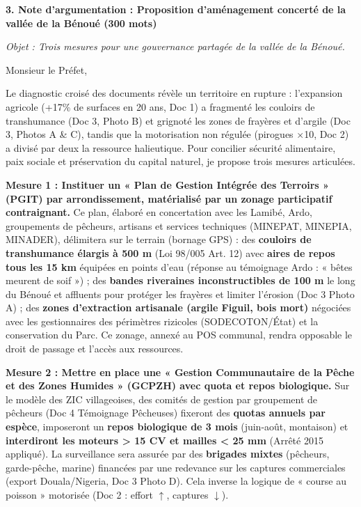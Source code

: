 \documentclass[11pt]{article}
\begin{document}
\begin{exoresolu}
\textbf{3. Note d'argumentation : Proposition d'aménagement concerté de la vallée de la Bénoué (300 mots)}

\textit{Objet : Trois mesures pour une gouvernance partagée de la vallée de la Bénoué.}

Monsieur le Préfet,

Le diagnostic croisé des documents révèle un territoire en rupture : l'expansion agricole (+17\% de surfaces en 20 ans, Doc 1) a fragmenté les couloirs de transhumance (Doc 3, Photo B) et grignoté les zones de frayères et d'argile (Doc 3, Photos A \& C), tandis que la motorisation non régulée (pirogues $\times$10, Doc 2) a divisé par deux la ressource halieutique. Pour concilier sécurité alimentaire, paix sociale et préservation du capital naturel, je propose trois mesures articulées.

\textbf{Mesure 1 : Instituer un « Plan de Gestion Intégrée des Terroirs » (PGIT) par arrondissement, matérialisé par un zonage participatif contraignant.} Ce plan, élaboré en concertation avec les Lamibé, Ardo, groupements de pêcheurs, artisans et services techniques (MINEPAT, MINEPIA, MINADER), délimitera sur le terrain (bornage GPS) : des \textbf{couloirs de transhumance élargis à 500 m} (Loi 98/005 Art. 12) avec \textbf{aires de repos tous les 15 km} équipées en points d'eau (réponse au témoignage Ardo : « bêtes meurent de soif ») ; des \textbf{bandes riveraines inconstructibles de 100 m} le long du Bénoué et affluents pour protéger les frayères et limiter l'érosion (Doc 3 Photo A) ; des \textbf{zones d'extraction artisanale (argile Figuil, bois mort)} négociées avec les gestionnaires des périmètres rizicoles (SODECOTON/État) et la conservation du Parc. Ce zonage, annexé au POS communal, rendra opposable le droit de passage et l'accès aux ressources.

\textbf{Mesure 2 : Mettre en place une « Gestion Communautaire de la Pêche et des Zones Humides » (GCPZH) avec quota et repos biologique.} Sur le modèle des ZIC villageoises, des comités de gestion par groupement de pêcheurs (Doc 4 Témoignage Pêcheuses) fixeront des \textbf{quotas annuels par espèce}, imposeront un \textbf{repos biologique de 3 mois} (juin-août, montaison) et \textbf{interdiront les moteurs > 15 CV et mailles < 25 mm} (Arrêté 2015 appliqué). La surveillance sera assurée par des \textbf{brigades mixtes} (pêcheurs, garde-pêche, marine) financées par une redevance sur les captures commerciales (export Douala/Nigeria, Doc 3 Photo D). Cela inverse la logique de « course au poisson » motorisée (Doc 2 : effort $\uparrow$, captures $\downarrow$).


\end{exoresolu}
\end{document}
